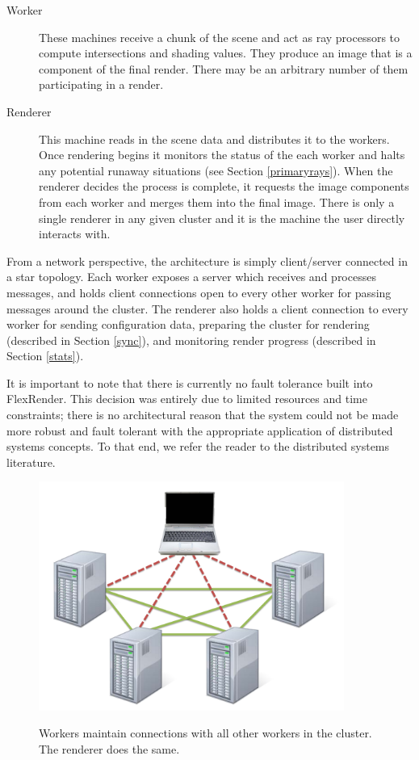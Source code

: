 \documentclass[12pt]{ucthesis}
\newcommand{\captionfonts}{\small\bf\ssp}
\begin{document}
\begin{description}
    \item[Worker] These machines receive a chunk of the scene and act as ray
        processors to compute intersections and shading values. They produce
        an image that is a component of the final render. There may be an
        arbitrary number of them participating in a render.
    \item[Renderer] This machine reads in the scene data and distributes it to
        the workers. Once rendering begins it monitors the status of the each
        worker and halts any potential runaway situations (see Section \ref{primaryrays}).
        When the renderer decides the process is complete, it requests
        the image components from each worker and merges them into the final
        image. There is only a single renderer in any given cluster and it is
        the machine the user directly interacts with.
\end{description}

From a network perspective, the architecture is simply client/server connected
in a star topology. Each worker exposes a server which receives and
processes messages, and holds client connections open to every other worker for
passing messages around the cluster. The renderer also holds a client connection
to every worker for sending configuration data, preparing the cluster for rendering
(described in Section \ref{sync}), and monitoring render progress (described in
Section \ref{stats}).

It is important to note that there is currently no fault tolerance built into
FlexRender. This decision was entirely due to limited resources and time
constraints; there is no architectural reason that the system could not be made
more robust and fault tolerant with the appropriate application of distributed
systems concepts. To that end, we refer the reader to the distributed systems
literature.

\begin{figure}[h!]
    \centering
    \includegraphics[width=100mm]{figures/netarch.pdf}
    \captionfonts
    \caption{Workers maintain connections with all other workers in the cluster. The renderer does the same.}
    \label{fig:netarch}
\end{figure}
\end{document}

